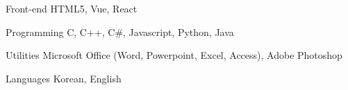 

\begin{cvskills}



  \cvskill
    {Front-end} %
    {HTML5, Vue, React} %

  \cvskill
    {Programming} %
    {C, C++, C\#, Javascript, Python, Java} %


  \cvskill
    {Utilities} %
    {Microsoft Office (Word, Powerpoint, Excel, Access), Adobe Photoshop} %

  \cvskill
    {Languages} %
    {Korean, English} %

\end{cvskills}
